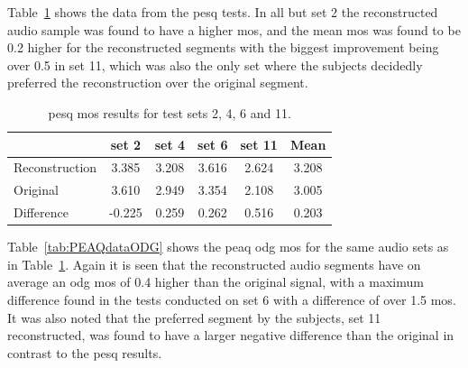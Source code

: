 Table~\ref{tab:PESQdata} shows the data from the \gls{pesq} tests. In all but set 2 the reconstructed audio sample was found to have a higher \gls{mos}, and the mean \gls{mos} was found to be 0.2 higher for the reconstructed segments with the biggest improvement being over 0.5 in set 11, which was also the only set where the subjects decidedly preferred the reconstruction over the original segment.

\begin{table}\begin{center}
\caption{\gls{pesq} \gls{mos} results for test sets 2, 4, 6 and 11.}
\label{tab:PESQdata}
\begin{tabular}{|l|c|c|c|c|c|}\hline
                    & set 2 & set 4 & set 6 & set 11  & Mean \\ \hline
  Reconstruction    & 3.385 & 3.208 & 3.616 & 2.624   & 3.208 \\
  Original          & 3.610 & 2.949 & 3.354 & 2.108   & 3.005 \\ \hline
  Difference        & -0.225& 0.259 & 0.262 & 0.516   & 0.203 \\
  \hline
\end{tabular}\end{center}\end{table}






Table~\ref{tab:PEAQdataODG} shows the \gls{peaq} \gls{odg} \gls{mos} for the same audio sets as in Table~\ref{tab:PESQdata}. Again it is seen that the reconstructed audio segments have on average an \gls{odg} \gls{mos} of 0.4 higher than the original signal, with a maximum difference found in the tests conducted on set 6 with a difference of over 1.5 \gls{mos}. It was also noted that the preferred segment by the subjects, set 11 reconstructed, was found to have a larger negative difference than the original in contrast to the \gls{pesq} results.

